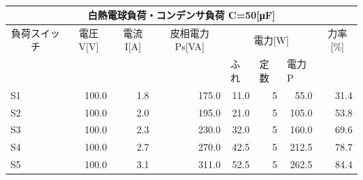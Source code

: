\documentclass[titlepage]{jarticle}
\begin{document}
\begin{table}[htbp]
    \caption{}
    \begin{tabular}{l|r|r|r|r|r|r|r}
        \multicolumn{ 8}{c}{白熱電球負荷・コンデンサ負荷 C=50[μF]}                                                                                                                                                                                                       \\ \hline
        \multicolumn{ 1}{c|}{負荷スイッチ} & \multicolumn{ 1}{c|}{電圧V[V]} & \multicolumn{ 1}{c|}{電流I[A]} & \multicolumn{ 1}{c|}{皮相電力Ps[VA]} & \multicolumn{ 3}{c|}{電力[W]} & \multicolumn{ 1}{c}{力率[\%]}                                                      \\ \cline{ 5- 7}
        \multicolumn{ 1}{c|}{}             & \multicolumn{ 1}{c|}{}         & \multicolumn{ 1}{c|}{}         & \multicolumn{ 1}{c|}{}               & \multicolumn{1}{l|}{ふれ}     & \multicolumn{1}{l|}{定数}     & \multicolumn{1}{l|}{電力P} & \multicolumn{ 1}{c}{} \\ \hline \hline
        S1                                 & 100.0                          & 1.8                            & 175.0                                & 11.0                          & 5                             & 55.0                       & 31.4                  \\ \hline
        S2                                 & 100.0                          & 2.0                            & 195.0                                & 21.0                          & 5                             & 105.0                      & 53.8                  \\ \hline
        S3                                 & 100.0                          & 2.3                            & 230.0                                & 32.0                          & 5                             & 160.0                      & 69.6                  \\ \hline
        S4                                 & 100.0                          & 2.7                            & 270.0                                & 42.5                          & 5                             & 212.5                      & 78.7                  \\ \hline
        S5                                 & 100.0                          & 3.1                            & 311.0                                & 52.5                          & 5                             & 262.5                      & 84.4                  \\ \hline
    \end{tabular}
    \label{}
\end{table}
\end{document}
